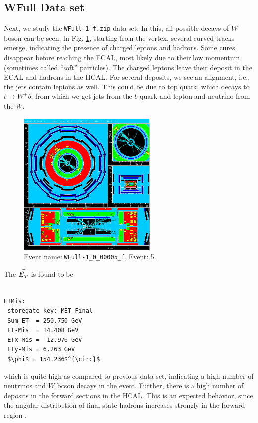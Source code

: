 \documentclass[a4paper]{report}
\numberwithin{equation}{section}
\begin{document}
\subsection{WFull Data set}

Next, we study the \texttt{WFull-1-f.zip} data set. In this, all possible decays of $W$ boson can be seen. In Fig. \ref{fig:wfull}, starting from the vertex, several curved tracks emerge, indicating the presence of charged leptons and hadrons. Some cures disappear before reaching the ECAL, most likely due to their low momentum (sometimes called ``soft'' particles). The charged leptons leave their deposit in the ECAL and hadrons in the HCAL. For several deposits, we see an alignment, i.e., the jets contain leptons as well. This could be due to top quark, which decays to $t \rightarrow W^+ b$, from which we get jets from the $b$ quark and lepton and neutrino from the $W$. 

\begin{figure}[htpb]
    \centering
    \includegraphics[width=0.6\textwidth]{WFull-1_0_00005_f-YX-RZ-RZ-YX-2022-05-23-13-21-03}
    \caption{Event name: \texttt{WFull-1\_0\_00005\_f}, Event: 5.}
    \label{fig:wfull}
\end{figure}

The $\vec{\slashed{E}_T}$ is found to be 

\begin{lstlisting}

ETMis:
 storegate key: MET_Final
 Sum-ET  = 250.750 GeV
 ET-Mis  = 14.408 GeV
 ETx-Mis = -12.976 GeV
 ETy-Mis = 6.263 GeV
 $\phi$ = 154.236$^{\circ}$
\end{lstlisting}
which is quite high as compared to previous data set, indicating a high number of neutrinos and $W$ boson decays in the event. Further, there is a high number of deposits in the forward sections in the HCAL. This is an expected behavior, since the angular distribution of final state hadrons increases strongly in the forward region \cite{labman}. 
\end{document}
